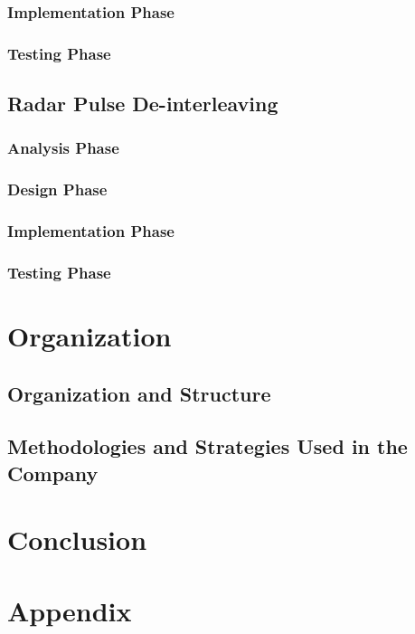 \documentclass[12pt]{report}
\begin{document}
            

        \subsection{Implementation Phase}

        \subsection{Testing Phase}

    \section{Radar Pulse De-interleaving}
        \subsection{Analysis Phase}

        \subsection{Design Phase}

        \subsection{Implementation Phase}

        \subsection{Testing Phase}

\chapter{Organization}

    \section{Organization and Structure}

    \section{Methodologies and Strategies Used in the Company}

\chapter{Conclusion}

\chapter{Appendix}
\end{document}
